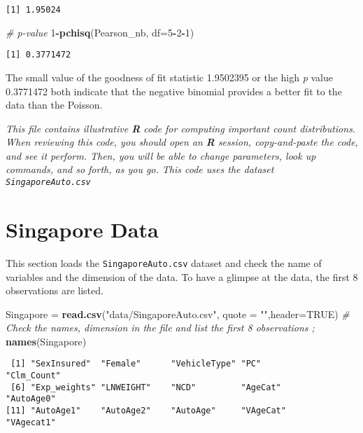 \documentclass[]{book}
\newenvironment{Shaded}{\begin{snugshade}}{\end{snugshade}}
\newcommand{\KeywordTok}[1]{\textcolor[rgb]{0.13,0.29,0.53}{\textbf{#1}}}
\newcommand{\DataTypeTok}[1]{\textcolor[rgb]{0.13,0.29,0.53}{#1}}
\newcommand{\DecValTok}[1]{\textcolor[rgb]{0.00,0.00,0.81}{#1}}
\newcommand{\StringTok}[1]{\textcolor[rgb]{0.31,0.60,0.02}{#1}}
\newcommand{\CommentTok}[1]{\textcolor[rgb]{0.56,0.35,0.01}{\textit{#1}}}
\newcommand{\OtherTok}[1]{\textcolor[rgb]{0.56,0.35,0.01}{#1}}
\newcommand{\OperatorTok}[1]{\textcolor[rgb]{0.81,0.36,0.00}{\textbf{#1}}}
\newcommand{\NormalTok}[1]{#1}
\theoremstyle{definition}
\theoremstyle{definition}
\theoremstyle{definition}
\theoremstyle{remark}
\begin{document}
\begin{verbatim}
[1] 1.95024
\end{verbatim}

\begin{Shaded}
\begin{Highlighting}[]
\CommentTok{#  p-value}
\DecValTok{1}\OperatorTok{-}\KeywordTok{pchisq}\NormalTok{(Pearson_nb, }\DataTypeTok{df=}\DecValTok{5}\OperatorTok{-}\DecValTok{2}\OperatorTok{-}\DecValTok{1}\NormalTok{)}
\end{Highlighting}
\end{Shaded}

\begin{verbatim}
[1] 0.3771472
\end{verbatim}

The small value of the goodness of fit statistic 1.9502395 or the high
\emph{p} value 0.3771472 both indicate that the negative binomial
provides a better fit to the data than the Poisson.

\emph{This file contains illustrative \textbf{R} code for computing
important count distributions. When reviewing this code, you should open
an \textbf{R} session, copy-and-paste the code, and see it perform.
Then, you will be able to change parameters, look up commands, and so
forth, as you go. This code uses the dataset \texttt{SingaporeAuto.csv}}

\section{Singapore Data}\label{singapore-data-1}

This section loads the \texttt{SingaporeAuto.csv} dataset and check the
name of variables and the dimension of the data. To have a glimpse at
the data, the first 8 observations are listed.

\begin{Shaded}
\begin{Highlighting}[]
\NormalTok{Singapore =}\StringTok{ }\KeywordTok{read.csv}\NormalTok{(}\StringTok{"data/SingaporeAuto.csv"}\NormalTok{,  }\DataTypeTok{quote =} \StringTok{""}\NormalTok{,}\DataTypeTok{header=}\OtherTok{TRUE}\NormalTok{)}
\CommentTok{#  Check the names, dimension in the file and list the first 8 observations ;}
\KeywordTok{names}\NormalTok{(Singapore)}
\end{Highlighting}
\end{Shaded}

\begin{verbatim}
 [1] "SexInsured"  "Female"      "VehicleType" "PC"          "Clm_Count"  
 [6] "Exp_weights" "LNWEIGHT"    "NCD"         "AgeCat"      "AutoAge0"   
[11] "AutoAge1"    "AutoAge2"    "AutoAge"     "VAgeCat"     "VAgecat1"   
\end{verbatim}
\end{document}

